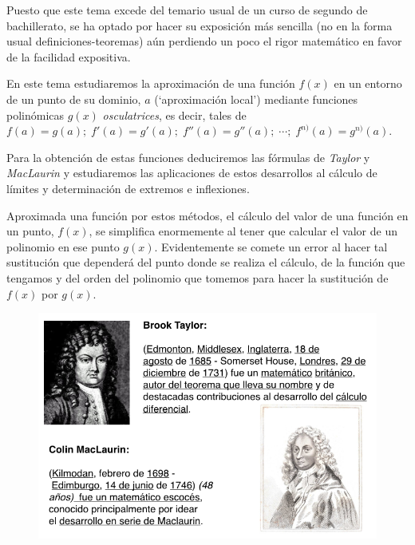 \vspace{0.5cm}

Puesto que este tema excede del temario usual de un curso de segundo de bachillerato, se ha optado por hacer su exposición más sencilla (no en la forma usual definiciones-teoremas) aún perdiendo un poco el rigor matemático en favor de la facilidad expositiva.

En este tema estudiaremos la aproximación de una función $f(x)$ en un entorno de un punto de su dominio, $a$ (`aproximación local') mediante funciones polinómicas $g(x)$ \emph{osculatrices}, es decir, tales de $f(a)=g(a); \; f'(a)=g'(a); \; f''(a)=g''(a); \; \cdots  ; \; f^{n)}(a)=g^{n)}(a)$.

Para la obtención de estas funciones deduciremos las fórmulas de \emph{Taylor} y \emph{MacLaurin} y estudiaremos las aplicaciones de estos desarrollos al cálculo de límites y determinación de extremos e inflexiones.


\begin{multicols}{2}
Aproximada una función por estos métodos, el cálculo del valor de una función en un punto, $f(x)$, se simplifica enormemente al tener que calcular el valor de un polinomio en ese punto $g(x)$. Evidentemente se comete un error al hacer tal sustitución que dependerá del punto donde se realiza el cálculo, de la función que tengamos y del orden del polinomio que tomemos para hacer la sustitución de $f(x)$ por $g(x)$.

	\begin{figure}[H]
		\centering
		\includegraphics[width=.5\textwidth]{imagenes/Taylor/T06IM01.png}
	\end{figure}
\end{multicols}
	
